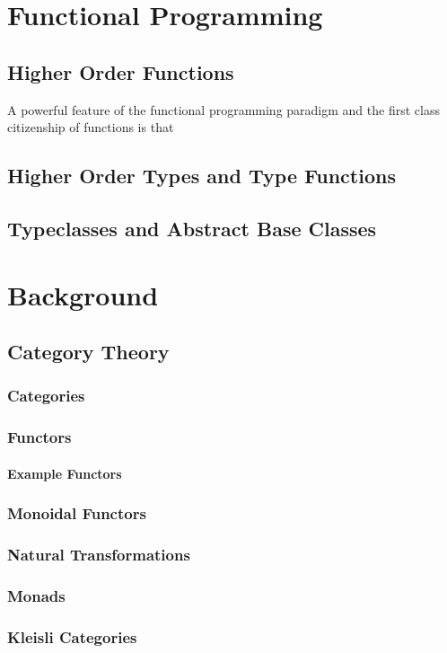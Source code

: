 \chapter{Functional Programming}
\section{Higher Order Functions}

A powerful feature of the functional programming paradigm and the first class citizenship of functions is that 

\section{Higher Order Types and Type Functions}
\section{Typeclasses and Abstract Base Classes}

\chapter{Background}
\section{Category Theory}
\subsection{Categories}
\subsection{Functors}
\subsubsection{Example Functors}
\subsection{Monoidal Functors}
\subsection{Natural Transformations}
\subsection{Monads}
\subsection{Kleisli Categories}

